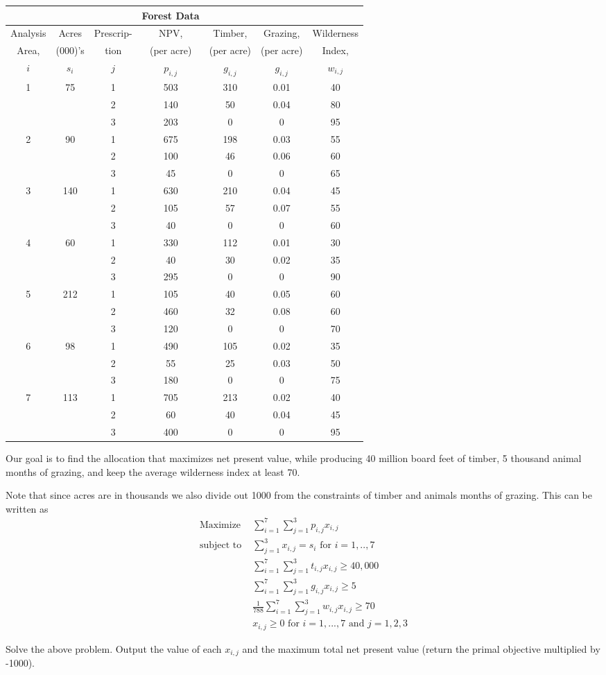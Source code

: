 \begin{center}
    \begin{tabular}{c c c c c c c}
&&&Forest Data&&& \\
\hline
Analysis & Acres &Prescrip-&NPV,&Timber,&Grazing,&Wilderness \\ 
Area,&(000)'s &tion&(per acre) &(per acre)&(per acre)& Index,\\
$i$ &$s_i$&$j$& $p_{i,j}$ & $g_{i,j}$&$g_{i,j}$&$w_{i,j}$ \\\hline
1&	75	&1	&503	&310	&0.01&	40\\
&&		2&	140&	50&	0.04	&80\\
&&		3&	203&	0&	0&	95\\ \hline
2&	90&	1	&675&	198&	0.03&	55\\
&&		2&	100&	46&	0.06&	60\\
&&		3&	45&	0&	0&	65\\ \hline
3&	140&	1	&630&	210	&0.04&	45\\
&&		2&	105&	57&	0.07&	55\\
&&		3&	40	&0&	0&	60\\ \hline
4	&60&	1&	330&	112&	0.01&	30\\
&&		2	&40&	30&	0.02&	35\\
&&		3&	295&	0&	0	&90\\ \hline
5	&212&	1	&105	&40	&0.05&	60\\
&&		2	&460&	32	&0.08&	60\\
&& 3	&120&0&	0	&70\\ \hline
6	&98	&1	&490	&105	&0.02	&35\\
&&		2&	55	&25	&0.03	&50\\
&&		3	&180	&0	&0	&75\\ \hline
7&	113&	1	&705	&213&	0.02	&40\\
&&		2&	60	&40	&0.04&	45\\
&&		3	&400	&0	&0	&95\\
\hline
    \end{tabular}
\end{center}
Our goal is to find the allocation that maximizes net present value, while producing 40 million board feet of timber, 5 thousand animal months of grazing, and keep the average wilderness index at least 70.

Note that since acres are in thousands we also divide out 1000 from the constraints of timber and animals months of grazing. This can be written as 
\begin{align*}
\text{Maximize } &\sum\limits_{i=1}^7 \sum\limits_{j=1}^3 p_{i,j}x_{i,j} \\
\text{subject to } &\sum\limits_{j=1}^3 x_{i,j} = s_i  \text{ for } i=1,..,7 \\
	        &\sum\limits_{i=1}^7 \sum\limits_{j=1}^3 t_{i,j}x_{i,j} \geq 40,000 \\
		&\sum\limits_{i=1}^7 \sum\limits_{j=1}^3 g_{i,j}x_{i,j} \geq 5 \\
		&\frac{1}{788} \sum\limits_{i=1}^7 \sum\limits_{j=1}^3 w_{i,j}x_{i,j} \geq 70 \\
		&x_{i,j} \geq 0 \text{ for } i=1,...,7  \text{ and } j=1,2,3
\end{align*}

\begin{problem}
Solve the above problem. Output the value of each $x_{i,j}$ and the maximum total net present value (return the primal objective multiplied by -1000).  
\end{problem}